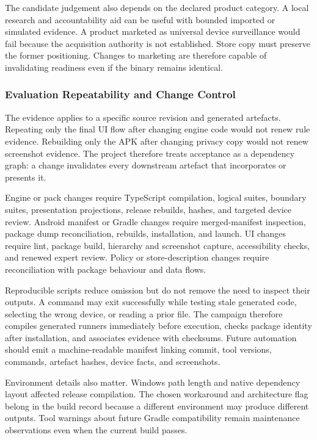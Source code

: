 The candidate judgement also depends on the declared product category. A local research and accountability aid can be useful with bounded imported or simulated evidence. A product marketed as universal device surveillance would fail because the acquisition authority is not established. Store copy must preserve the former positioning. Changes to marketing are therefore capable of invalidating readiness even if the binary remains identical.

\subsubsection{Evaluation Repeatability and Change Control}

The evidence applies to a specific source revision and generated artefacts. Repeating only the final UI flow after changing engine code would not renew rule evidence. Rebuilding only the APK after changing privacy copy would not renew screenshot evidence. The project therefore treats acceptance as a dependency graph: a change invalidates every downstream artefact that incorporates or presents it.

Engine or pack changes require TypeScript compilation, logical suites, boundary suites, presentation projections, release rebuilds, hashes, and targeted device review. Android manifest or Gradle changes require merged-manifest inspection, package dump reconciliation, rebuilds, installation, and launch. UI changes require lint, package build, hierarchy and screenshot capture, accessibility checks, and renewed expert review. Policy or store-description changes require reconciliation with package behaviour and data flows.

Reproducible scripts reduce omission but do not remove the need to inspect their outputs. A command may exit successfully while testing stale generated code, selecting the wrong device, or reading a prior file. The campaign therefore compiles generated runners immediately before execution, checks package identity after installation, and associates evidence with checksums. Future automation should emit a machine-readable manifest linking commit, tool versions, commands, artefact hashes, device facts, and screenshots.

Environment details also matter. Windows path length and native dependency layout affected release compilation. The chosen workaround and architecture flag belong in the build record because a different environment may produce different outputs. Tool warnings about future Gradle compatibility remain maintenance observations even when the current build passes.

